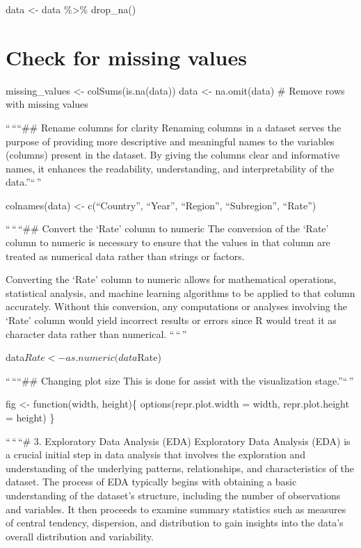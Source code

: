 \documentclass[
]{article}
\begin{document}
data \textless- data \%\textgreater\% drop\_na()

\hypertarget{check-for-missing-values}{%
\section{Check for missing values}\label{check-for-missing-values}}

missing\_values \textless- colSums(is.na(data)) data \textless-
na.omit(data) \# Remove rows with missing values

``\,````\#\# Rename columns for clarity Renaming columns in a dataset
serves the purpose of providing more descriptive and meaningful names to
the variables (columns) present in the dataset. By giving the columns
clear and informative names, it enhances the readability, understanding,
and interpretability of the data.''``\,''

colnames(data) \textless- c(``Country'', ``Year'', ``Region'',
``Subregion'', ``Rate'')

``\,``\,``\#\# Convert the `Rate' column to numeric The conversion of
the `Rate' column to numeric is necessary to ensure that the values in
that column are treated as numerical data rather than strings or
factors.

Converting the `Rate' column to numeric allows for mathematical
operations, statistical analysis, and machine learning algorithms to be
applied to that column accurately. Without this conversion, any
computations or analyses involving the `Rate' column would yield
incorrect results or errors since R would treat it as character data
rather than numerical. ``\,``\,''

data\(Rate <- as.numeric(data\)Rate)

``\,````\#\# Changing plot size This is done for assist with the
visualization stage.''``\,''

fig \textless- function(width, height)\{ options(repr.plot.width =
width, repr.plot.height = height) \}

``\,``\,``\# 3. Exploratory Data Analysis (EDA) Exploratory Data
Analysis (EDA) is a crucial initial step in data analysis that involves
the exploration and understanding of the underlying patterns,
relationships, and characteristics of the dataset. The process of EDA
typically begins with obtaining a basic understanding of the dataset's
structure, including the number of observations and variables. It then
proceeds to examine summary statistics such as measures of central
tendency, dispersion, and distribution to gain insights into the data's
overall distribution and variability.
\end{document}
